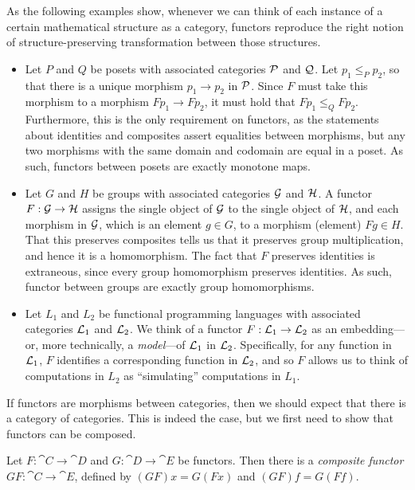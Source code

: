 \begin{ex}
  As the following examples show, whenever we can think of each instance of a
  certain mathematical structure as a category, functors reproduce the right
  notion of structure-preserving transformation between those structures.
  \begin{itemize}
    \item Let $P$ and $Q$ be posets with associated categories $\mathcal{P}$ and $\mathcal{Q}$. Let
      $p_1\leq_P p_2$, so that there is a unique morphism $p_1\to p_2$ in $\mathcal{P}$. Since
      $F$ must take this morphism to a morphism $Fp_1\to Fp_2$, it must hold that
      $Fp_1\leq_Q Fp_2$. Furthermore, this is the only requirement on functors, as
      the statements about identities and composites assert equalities between
      morphisms, but any two morphisms with the same domain and codomain are equal
      in a poset. As such, functors between posets are exactly monotone maps.
    \item Let $G$ and $H$ be groups with associated categories $\mathcal{G}$ and
      $\mathcal{H}$. A functor $F: \mathcal{G}\to\mathcal{H}$ assigns the single object of $\mathcal{G}$ to the
      single object of $\mathcal{H}$, and each morphism in $\mathcal{G}$, which is an element $g\in
      G$, to a morphism (element) $Fg\in H$. That this preserves composites tells us
      that it preserves group multiplication, and hence it is a homomorphism. The
      fact that $F$ preserves identities is extraneous, since every group
      homomorphism preserves identities. As such, functor between groups are exactly
      group homomorphisms.
    \item Let $L_1$ and $L_2$ be functional programming languages with associated
      categories $\mathcal{L}_1$ and $\mathcal{L}_2$. We think of a functor $F: \mathcal{L}_1\to\mathcal{L}_2$ as an
      embedding---or, more technically, a \emph{model}---of $\mathcal{L}_1$ in $\mathcal{L}_2$.
      Specifically, for any function in $\mathcal{L}_1$, $F$ identifies a corresponding
      function in $\mathcal{L}_2$, and so $F$ allows us to think of computations in $L_2$ as
      ``simulating'' computations in $L_1$.
  \end{itemize}
\end{ex}

If functors are morphisms between categories, then we should expect that there
is a category of categories. This is indeed the case, but we first need to show
that functors can be composed.

\begin{prop}
  Let $F: \cat{C}\to\cat{D}$ and $G: \cat{D}\to\cat{E}$ be functors. Then there
  is a \emph{composite functor} $GF: \cat{C}\to\cat{E}$, defined by $(GF)x =
  G(Fx)$ and $(GF)f = G(Ff)$.
\end{prop}


